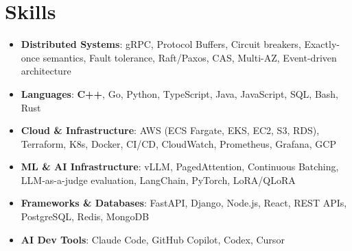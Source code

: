 \documentclass[letterpaper,11pt]{article}
\newcommand{\resumeSubHeadingListStart}{\begin{itemize}[leftmargin=0.15in, label={}]}
\newcommand{\resumeSubHeadingListEnd}{\end{itemize}}
\newcommand{\resumeSkillHeading}[2]{%
  \item\small{\textbf{#1}: #2 \vspace{-9pt}}%
}
\begin{document}
\section{Skills}
  \resumeSubHeadingListStart
    \resumeSkillHeading{Distributed Systems}{gRPC, Protocol Buffers, Circuit breakers, Exactly-once semantics, Fault tolerance, Raft/Paxos, CAS, Multi-AZ, Event-driven architecture}
    \resumeSkillHeading{Languages}{\textbf{C++}, Go, Python, TypeScript, Java, JavaScript, SQL, Bash, Rust}
    \resumeSkillHeading{Cloud \& Infrastructure}{AWS (ECS Fargate, EKS, EC2, S3, RDS), Terraform, K8s, Docker, CI/CD, CloudWatch, Prometheus, Grafana, GCP}
    \resumeSkillHeading{ML \& AI Infrastructure}{vLLM, PagedAttention, Continuous Batching, LLM-as-a-judge evaluation, LangChain, PyTorch, LoRA/QLoRA}
    \resumeSkillHeading{Frameworks \& Databases}{FastAPI, Django, Node.js, React, REST APIs, PostgreSQL, Redis, MongoDB}
    \resumeSkillHeading{AI Dev Tools}{Claude Code, GitHub Copilot, Codex, Cursor}
  \resumeSubHeadingListEnd
\end{document}
